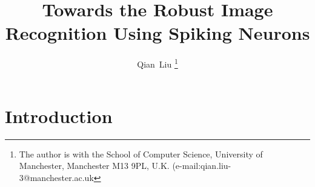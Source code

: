 \documentclass[journal]{journal}
\begin{document}
	\title{Towards the Robust Image Recognition Using Spiking Neurons}
	\author{
	Qian~Liu
	\thanks{
	The author is with the School of Computer Science, University of Manchester, Manchester M13 9PL, U.K. 
	(e-mail:qian.liu-3@manchester.ac.uk}
	}
	\maketitle
	\thispagestyle{empty}

\begin{abstract}

\end{abstract}

\section{Introduction}
\end{document}
